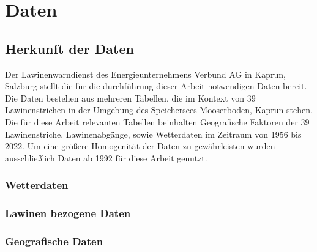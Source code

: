 \documentclass[12pt,a4paper]{article}
\title{\titlename}
\author{ \authorname\\ \scriptsize \authormail \\ \scriptsize \address }
\author{ \authorid\\ \scriptsize \address }
\date{\exposedate}
\begin{document}



\maketitle

\tableofcontents
\newpage



\section{Daten}

\subsection{Herkunft der Daten}
Der Lawinenwarndienst des Energieunternehmens Verbund AG in Kaprun, Salzburg stellt die für die durchführung dieser Arbeit notwendigen Daten bereit. Die Daten bestehen aus mehreren Tabellen, die im Kontext von 39 Lawinenstrichen in der Umgebung des Speichersees Mooserboden, Kaprun stehen. Die für diese Arbeit relevanten Tabellen beinhalten Geografische Faktoren der 39 Lawinenstriche, Lawinenabgänge, sowie Wetterdaten im Zeitraum von 1956 bis 2022. Um eine größere Homogenität der Daten zu gewährleisten wurden ausschließlich Daten ab 1992 für diese Arbeit genutzt.

\subsubsection{Wetterdaten}

\subsubsection{Lawinen bezogene Daten}

\subsubsection{Geografische Daten}











\newpage
{}
\printbibliography
\end{document}
